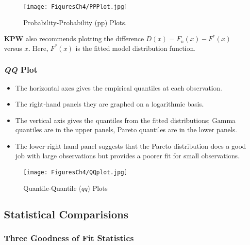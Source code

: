 \documentclass[]{book}
\begin{document}
\begin{figure}
\centering
\texttt{[image: FiguresCh4/PPPlot.jpg]}
\caption{Probability-Probability (pp) Plots.}
\end{figure}

\textbf{KPW} also recommends plotting the difference
\(D(x) = F_n(x) - F^*(x)\) versus \(x\). Here, \(F^*(x)\) is the fitted
model distribution function.

\subsubsection{\texorpdfstring{\emph{QQ} Plot}{QQ Plot}}\label{qq-plot}

\begin{itemize}
\item
  The horizontal axes gives the empirical quantiles at each observation.
\item
  The right-hand panels they are graphed on a logarithmic basis.
\item
  The vertical axis gives the quantiles from the fitted distributions;
  Gamma quantiles are in the upper panels, Pareto quantiles are in the
  lower panels.
\item
  The lower-right hand panel suggests that the Pareto distribution does
  a good job with large observations but provides a poorer fit for small
  observations.
\end{itemize}

\begin{figure}
\centering
\texttt{[image: FiguresCh4/QQplot.jpg]}
\caption{Quantile-Quantile (\(qq\)) Plots}
\end{figure}

\subsection{Statistical Comparisions}\label{statistical-comparisions}

\subsubsection{Three Goodness of Fit
Statistics}\label{three-goodness-of-fit-statistics}
\end{document}
